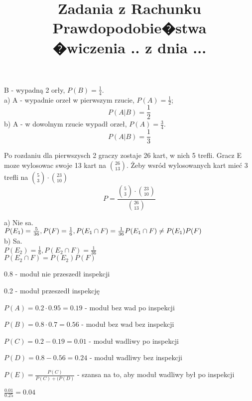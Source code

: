 \documentclass[fleqn]{article}
\begin{document}
\title{Zadania z Rachunku Prawdopodobie�stwa \\ �wiczenia .. z dnia ...}
\date{}
\medskip


B - wypadną 2 orły, $P(B) = \frac{1}{4}$. \\
a) A - wypadnie orzeł w pierwszym rzucie, $P(A) = \frac{1}{2}$; \\
   \[P(A|B) = \frac{1}{2}\]
b) A - w dowolnym rzucie wypadł orzeł, $P(A) = \frac{3}{4}$. \\
   \[P(A|B) =\frac{1}{3}\]

\medskip

\medskip

Po rozdaniu dla pierwszysch 2 graczy zostaje 26 kart, w nich 5 trefli. Gracz E moze wylosowac swoje 13 kart na ${26 \choose 13}$. Żeby wsród wylosowanych kart mieć 3 trefli na ${5 \choose 3}\cdot{23 \choose 10}$\\
\[P = \frac{{5 \choose 3}\cdot{23 \choose 10}}{{26 \choose 13}}\]

\medskip

\medskip

a) Nie sa.\\
$P(E_{1})=\frac{5}{36},P(F)=\frac{1}{6}, P(E_{1}\cap F)=\frac{1}{36}\\ P(E_{1}\cap F)\neq P(E_{1})P(F)$\\
b) Sa.\\
$P(E_{2})=\frac{1}{6}, P(E_{2}\cap F)=\frac{1}{36}$\\
$P(E_{2}\cap F)=P(E_{2})P(F)$\\

\medskip
{}
\medskip

0.8 - moduł nie przeszedł inspekcji

0.2 - moduł przeszedł inspekcję

$P(A) = 0.2 \cdot 0.95 = 0.19$ - moduł bez wad po inspekcji

$P(B) = 0.8 \cdot 0.7 = 0.56$ - moduł bez wad bez inspekcji

$P(C) = 0.2 - 0.19 = 0.01$ - moduł wadliwy po inspekcji

$P(D) = 0.8 - 0.56 = 0.24$ - moduł wadliwy bez inspekcji

$P(E) = \frac{P(C)}{P(C)+(P(D)}$ - szansa na to, aby moduł wadliwy był po inspekcji

$\frac{0.01}{0.25} = 0.04$

\medskip
{}
\medskip
\end{document}
